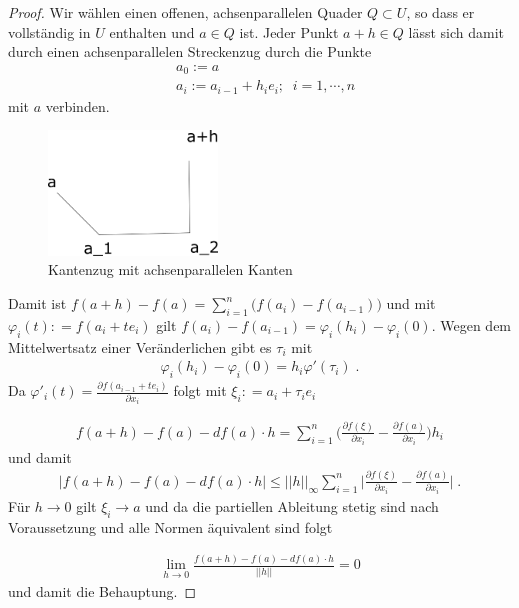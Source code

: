 \begin{proof}
Wir wählen einen offenen, achsenparallelen Quader $Q \subset U$, so dass er vollständig in $U$ enthalten und $a \in Q$ ist.
Jeder Punkt $a + h \in Q$  lässt sich damit durch einen achsenparallelen Streckenzug durch die Punkte
\begin{align*}
& a_0 := a \\
& a_i  := a_{i-1} + h_i e_i;  \;  \;  i = 1, \cdots , n
\end{align*} 
mit $a$ verbinden. 
\begin{figure}[H]
      \centering
    \includegraphics[width=0.4\textwidth]{images/kantenzug}
      \caption{Kantenzug mit achsenparallelen Kanten}
\end{figure}

Damit ist $f(a + h) - f(a) = \sum_{i=1}^{n} \bigl( f (a_i)   - f(a_{i-1})   \bigr)$ und  mit $\varphi_i(t) : = f(a_i + t e_i)$ gilt 
$f(a_i) - f(a_{i-1}) = \varphi_i(h_i)  - \varphi_i(0)$. Wegen dem Mittelwertsatz einer Veränderlichen gibt  es  $\tau_i$  mit
\begin{align*}
\varphi_i(h_i)  - \varphi_i(0)  = h_i \varphi'(\tau_i) \;.
\end{align*} 
Da $\varphi'_i(t) = \frac{\partial  f(a_{i-1} + t e_i ) }{\partial x_i}$ folgt mit $\xi_i: = a_i + \tau_i e_i$ 

\begin{align*}
f(a + h) - f(a) - df(a) \cdot h = \sum_{i=1}^n  \biggl( \frac{\partial  f(\xi) }{\partial x_i} -    \frac{\partial  f(a) }{\partial x_i}   \biggr) h_i
\end{align*} 
und damit
\begin{align*}
| f(a + h) - f(a) - df(a) \cdot h |  \leq || h ||_{\infty}  \sum_{i=1}^n  \biggl| \frac{\partial  f(\xi) }{\partial x_i} -    \frac{\partial  f(a) }{\partial x_i}   \biggr | \; . 
\end{align*} 
Für $h \to 0$ gilt $\xi_i \to a$ und da die partiellen Ableitung stetig sind nach Voraussetzung und alle Normen äquivalent sind folgt

\begin{align*}
\lim_{h \to 0} \frac{ f(a + h) - f(a) - df(a) \cdot h}{||h||} = 0 
\end{align*} 
und damit die Behauptung.
\end{proof}

